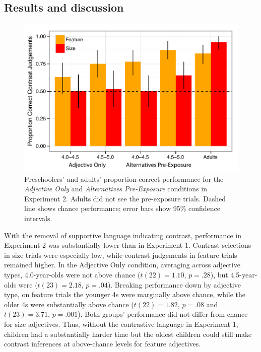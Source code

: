 \documentclass[man]{apa2}
\begin{document}
\subsection{Results and discussion}

\begin{figure}[t] 
  \begin{center} 
    \includegraphics[width=5in]{figures/expt2_mod.pdf} 
    \caption{\label{fig:expt2_kidsAdults} Preschoolers' and adults' proportion correct performance for the \emph{Adjective Only} and \emph{Alternatives Pre-Exposure} conditions in Experiment 2. Adults did not see the pre-exposure trials. Dashed line shows chance performance; error bars show 95\% confidence intervals.}
  \end{center} 
\end{figure}

With the removal of supportive language indicating contrast, performance in Experiment 2 was substantially lower than in Experiment 1. Contrast selections in size trials were especially low, while contrast judgements in feature trials remained higher. In the Adjective Only condition, averaging across adjective types, 4.0-year-olds were not above chance ($t(22) = 1.10$, $p = .28$), but 4.5-year-olds were ($t(23)=2.18$, $p = .04$). Breaking performance down by adjective type, on feature trials the younger 4s were marginally above chance, while the older 4s were substantially above chance ($t(22) = 1.82$, $p = .08$ and $t(23)=3.71$, $p = .001$). Both groups' performance did not differ from chance for size adjectives. Thus, without the contrastive language in Experiment 1, children had a substantially harder time but the oldest children could still make contrast inferences at above-chance levels for feature adjectives. 
\end{document}
